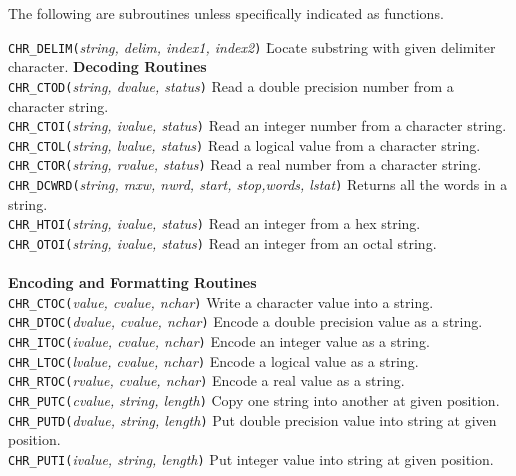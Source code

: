 \documentclass[twoside,11pt,nolof]{starlink}
\begin{document}
The following are subroutines unless specifically indicated as functions.
\begin{tabbing}
 {{\tt{CHR\_DELIM(}}\emph{string, delim, index1, index2}\texttt{)}} \=
 Locate substring with given delimiter character.\kill
\textbf{Decoding Routines}\\
 {{\tt{CHR\_CTOD(}}\emph{string, dvalue, status}\texttt{)}}  \>
 Read a double precision number from a character string.\\
 {{\tt{CHR\_CTOI(}}\emph{string, ivalue, status}\texttt{)}}\>
 Read an integer number from a character string.\\
 {{\tt{CHR\_CTOL(}}\emph{string, lvalue, status}\texttt{)}}\>
 Read a logical value from a character string.\\
 {{\tt{CHR\_CTOR(}}\emph{string, rvalue, status}\texttt{)}}\>
 Read a real number from a character string.\\
 {{\tt{CHR\_DCWRD(}}\emph{string, mxw, nwrd, start, stop,words, lstat}\texttt{)}}
 Returns all the words in a string.\\
 {{\tt{CHR\_HTOI(}}\emph{string, ivalue, status}\texttt{)}}\>
 Read an integer from a hex string.\\
 {{\tt{CHR\_OTOI(}}\emph{string, ivalue, status}\texttt{)}}\>
 Read an integer from an octal string.\\
\\
\textbf{Encoding and Formatting Routines}\\
 {{\tt{CHR\_CTOC(}}\emph{value, cvalue, nchar}\texttt{)}}\>
 Write a character value into a string.\\
 {{\tt{CHR\_DTOC(}}\emph{dvalue, cvalue, nchar}\texttt{)}}\>
 Encode a double precision value as a string.\\
 {{\tt{CHR\_ITOC(}}\emph{ivalue, cvalue, nchar}\texttt{)}}\>
 Encode an integer value as a string.\\
 {{\tt{CHR\_LTOC(}}\emph{lvalue, cvalue, nchar}\texttt{)}}\>
 Encode a logical value as a string.\\
 {{\tt{CHR\_RTOC(}}\emph{rvalue, cvalue, nchar}\texttt{)}}\>
 Encode a real value as a string.\\
 {{\tt{CHR\_PUTC(}}\emph{cvalue, string, length}\texttt{)}}\>
 Copy one string into another at given position.\\
 {{\tt{CHR\_PUTD(}}\emph{dvalue, string, length}\texttt{)}}\>
 Put double precision value into string at given position.\\
 {{\tt{CHR\_PUTI(}}\emph{ivalue, string, length}\texttt{)}}\>
 Put integer value into string at given position.\\

\end{tabbing}
\end{document}
